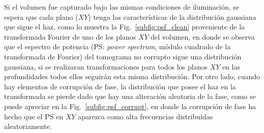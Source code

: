Si el volumen fue capturado bajo las mismas condiciones de iluminación, se espera que cada plano \enface ($XY$) tenga las características de la distribución gaussiana que sigue el haz, como lo muestra la Fig.~\ref{subfig:psf_clean} proveniente de la transformada Fourier de uno de los planos $XY$ del volumen, en donde se observa que el espectro de potencia (PS: \textit{power spectrum}, módulo cuadrado de la transformada de Fourier) del tomograma no corrupto sigue una distribución gaussiana, si se realizaran transformaciones para todos los planos $XY$ en las profundidades todos ellos seguirán esta misma distribución. Por otro lado, cuando hay elementos de corrupción de fase, la distribución que posee el haz en la transformada se pierde dado que hay una alteración aleatoria de la fase, como se puede apreciar en la Fig.~\ref{subfig:psf_corrupt}, en donde la corrupción de fase ha hecho que el PS en $XY$ aparezca como alta frecuencias distribuidas aleatoriamente. 


